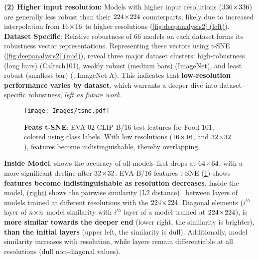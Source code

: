 \textbf{(2) Higher input resolution:} 
Models with higher input resolutions (\eg $336\!\times\!336$) are generally less robust than their $224\!\times\!224$ counterparts, likely due to increased interpolation from $16\!\times\!16$ to higher resolutions (\underline{\cref{fig:deepanalysis2} (left)}). \vspace{5pt} \\  
\noindent \textbf{Dataset Specific}:
Relative robustness of 66 models on each dataset forms its robustness vector representations. 
Representing these vectors using t-SNE (\underline{\cref{fig:deepanalysis2} (mid)}), reveal three major dataset clusters:
high-robustness (long bars) (\eg Caltech101), 
weakly robust (medium bars) (\eg ImageNet), and 
least robust (smallest bar) (\eg, ImageNet-A).
This indicates that \textbf{low-resolution performance varies by dataset}, which warrants a deeper dive into dataset-specific robustness, \textit{left as future work}.  


\begin{figure}[!t]
  \centering
  \texttt{[image: Images/tsne.pdf]}
  \caption{\textbf{Feats t-SNE}: EVA-02-CLIP-B/16 test features for Food-101, colored using class labels. With low resolutions ($16\!\times\!16$, and $32\!\times\!32$), features become indistinguishable, thereby overlapping.
  }
  \label{fig:tsne_feats}
  \vspace{-3pt}
\end{figure}

\noindent \textbf{Inside Model}:
\underline{} shows the accuracy of all models first drops at $64\!\times\!64$, with a more significant decline after $32\!\times\!32$.
EVA-B/16 features t-SNE (\underline{\cref{fig:tsne_feats}}) shows \textbf{features become indistinguishable as resolution decreases}.
Inside the model, \underline{ (right)} shows the pairwise similarity (L2 distance)~\citep{kornblith2019similarity}
between layers of models trained at different resolutions with the $224\!\times\!224$. Diagonal elements ($i^{th}$ layer of $n\!\times\! n$ model similarity with $i^{th}$ layer of a model trained at $224\!\times\!224$), is \textbf{more similar towards the deeper end} (lower right, the similarity is brighter), \textbf{than the initial layers} (upper left, the similarity is dull).  
Additionally, 
model similarity increases with resolution, while layers remain differentiable at all resolutions (dull non-diagonal values).
\vspace{-5pt}